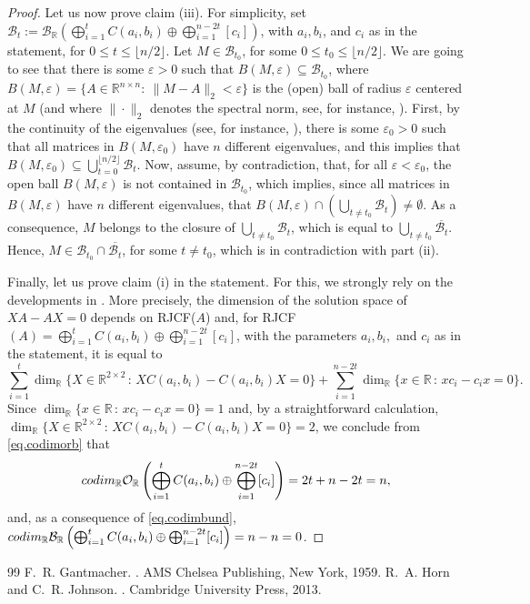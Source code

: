 \documentclass[10pt,a4paper]{amsart}
\newcommand{\R}{\mathbb R}
\newcommand{\bun}{{\mathcal B}}
\newcommand{\bunr}{{\mathcal B}_{\R}}
\newcommand{\cod}{{\rm codim}_\R}
\newcommand{\orbr}{{\mathcal O}_{\R}}
\begin{document}
\begin{proof}
 Let us now prove claim (iii). For simplicity, set $\bun_t:=\bunr \left(\bigoplus_{i=1}^tC(a_i,b_i)\oplus\bigoplus_{i=1}^{n-2t}[c_i]\right)$, with $a_i, b_i$, and $c_i$ as in the statement, for $0\leq t\leq\lfloor n/2\rfloor$. Let $M\in\bun_{t_0}$, for some $0\leq t_0\leq\lfloor n/2\rfloor$. We are going to see that there is some $\varepsilon>0$ such that $B(M,\varepsilon)\subseteq \bun_{t_0}$, where $B(M,\varepsilon)=\{A\in\R^{n\times n}:\ \|M-A\|_2<\varepsilon\}$ is the (open) ball of radius $\varepsilon$ centered at $M$ (and where $\|\cdot\|_2$ denotes the spectral norm, see, for instance, \cite[Example 5.6.6]{hj13}). First, by the continuity of the eigenvalues (see, for instance, \cite[Th. D.2]{hj13}), there is some $\varepsilon_0>0$ such that all matrices in $B(M,\varepsilon_0)$ have $n$ different eigenvalues, and this implies that $B(M,\varepsilon_0)\subseteq \bigcup_{t=0}^{\lfloor n/2\rfloor}\bun_t$. Now, assume, by contradiction, that, for all $\varepsilon<\varepsilon_0$, the open ball $B(M,\varepsilon)$ is not contained in $\bun_{t_0}$, which implies, since all matrices in $B(M,\varepsilon)$ have $n$ different eigenvalues, that $B(M,\varepsilon)\cap \left(\bigcup_{t\neq t_0}\bun_t\right)\neq\emptyset$. As a consequence, $M$ belongs to the closure of $\bigcup_{t\neq t_0}\bun_t$, which is equal to $\bigcup_{t\neq t_0}\overline{\bun_t}$. Hence, $M\in\bun_{t_0}\cap\overline{\bun_t}$, for some $t\neq t_0$, which is in contradiction with part (ii).


Finally, let us prove claim (i) in the statement. For this, we strongly rely on the developments in \cite[Ch. VIII]{gant}. More precisely, the dimension of the solution space of $XA-AX=0$ depends on RJCF($A$) and, for RJCF$(A)=\bigoplus_{i=1}^tC(a_i,b_i)\oplus\bigoplus_{i=1}^{n-2t}[c_i]$, with the parameters $a_i, b_i,$ and $ c_i$ as in the statement, it is equal to
$$
\sum_{i=1}^t \dim_\R\{ X\in\R^{2\times 2} \, : \, XC(a_i,b_i)-C(a_i,b_i)X=0 \}+\sum_{i=1}^{n-2t}\dim_\R\{ x\in\R \, : \, xc_i-c_ix=0 \}.
$$
Since $\dim_\R\{ x\in\R \, : \, xc_i-c_ix=0 \} =1$ and, by a straightforward calculation, $\dim_\R\{ X\in\R^{2\times 2} \, : \, XC(a_i,b_i)-C(a_i,b_i)X=0 \}=2$, we conclude from \eqref{eq.codimorb} that
$$
\cod\orbr\left(\bigoplus_{i=1}^tC(a_i,b_i)\oplus\bigoplus_{i=1}^{n-2t}[c_i]\right)=2t+ n - 2t=n,
$$
and, as a consequence of \eqref{eq.codimbund}, $\cod\bunr\left(\bigoplus_{i=1}^tC(a_i,b_i)\oplus\bigoplus_{i=1}^{n-2t}[c_i]\right)=n-n=0$.
\end{proof}

\begin{thebibliography}{99}
 F.~R. Gantmacher. . \newblock AMS Chelsea Publishing, New York, 1959.
 R.~A. Horn and C.~R. Johnson. . \newblock Cambridge University Press, 2013.
\end{thebibliography}
\end{document}
